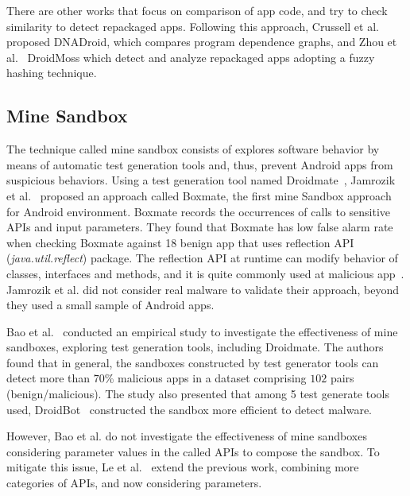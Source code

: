 There are other works that focus on comparison of app code, and try to check similarity to detect repackaged apps. Following this approach, Crussell et al.~\cite{DBLP:conf/esorics/CrussellGC12} proposed  DNADroid, which compares program dependence graphs, and Zhou et al.~\cite{DBLP:conf/codaspy/ZhouZJN12} DroidMoss which detect and analyze repackaged apps adopting a fuzzy hashing technique.

\subsection{Mine Sandbox}\label{sec:mineSandbox}

The technique called mine sandbox consists of explores software behavior by means of automatic test generation tools and, thus, prevent
Android apps from suspicious behaviors. Using a test generation tool named Droidmate~\cite{DBLP:conf/icse/JamrozikZ16}, Jamrozik et al.~\cite{DBLP:conf/icse/JamrozikSZ16} proposed an approach called Boxmate, the first mine Sandbox approach for Android environment. Boxmate records the occurrences of calls to sensitive APIs and input parameters. They found that Boxmate has low false alarm rate when checking Boxmate against 18 benign app that uses reflection API (\textit{java.util.reflect}) package. The reflection API at runtime can modify behavior of classes, interfaces and methods, and it is quite commonly used at malicious app~\cite{DBLP:conf/issta/0029BOK16}. Jamrozik et al. did not consider real malware to validate their approach, beyond they used a small sample of Android apps.

Bao et al.~\cite{DBLP:conf/wcre/BaoLL18} conducted an empirical study to investigate the effectiveness of mine sandboxes, exploring test generation tools, including Droidmate. The authors found that in general, the sandboxes constructed by test generator tools can detect more than $70$\% malicious apps in a dataset comprising $102$ pairs (benign/malicious). The study also presented that among 5 test generate tools used, DroidBot~\cite{DBLP:conf/icse/LiYGC17} constructed the sandbox more efficient to detect malware.

However, Bao et al. do not investigate the effectiveness of mine sandboxes considering parameter values in the called APIs to compose the sandbox. To mitigate this issue, Le et al.~\cite{le2018towards} extend the previous work, combining more categories of APIs, and now considering parameters.

